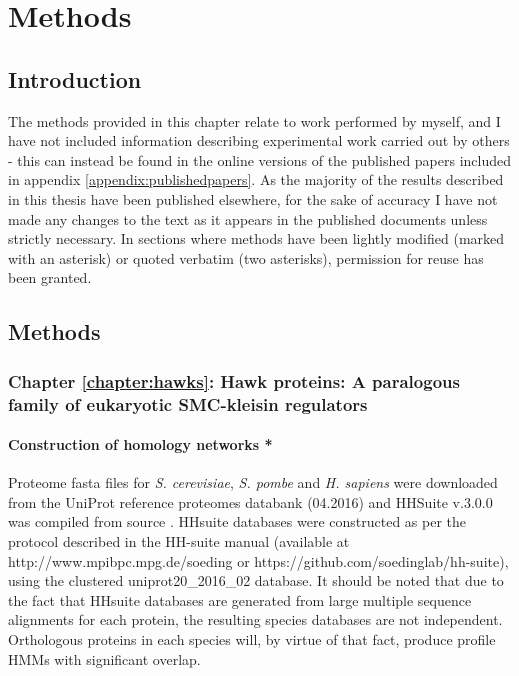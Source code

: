 \documentclass[a4paper,11pt,twoside,openright]{scrbook}
\begin{document}
\chapter{Methods}

\section{Introduction}
The methods provided in this chapter relate to work performed by myself, and I have not included information describing experimental work carried out by others - this can instead be found in the online versions of the published papers included in appendix \ref{appendix:publishedpapers}. As the majority of the results described in this thesis have been published elsewhere, for the sake of accuracy I have not made any changes to the text as it appears in the published documents unless strictly necessary. In sections where methods have been lightly modified (marked with an asterisk) or quoted verbatim (two asterisks), permission for reuse has been granted.

\section{Methods}

\subsection{Chapter \ref*{chapter:hawks}: Hawk proteins: A paralogous family of eukaryotic SMC-kleisin regulators}

\subsubsection{Construction of homology networks *}
Proteome fasta files for \textit{S. cerevisiae}, \textit{S. pombe} and \textit{H. sapiens} were downloaded from the UniProt reference proteomes databank \cite{Consortium2017} (04.2016) and HHSuite v.3.0.0 was compiled from source \cite{Soding2005,Remmert2011}. HHsuite databases were constructed as per the protocol described in the HH-suite manual (available at http://www.mpibpc.mpg.de/soeding or https://github.com/soedinglab/hh-suite), using the clustered uniprot20\_2016\_02 database. It should be noted that due to the fact that HHsuite databases are generated from large multiple sequence alignments for each protein, the resulting species databases are not independent. Orthologous proteins in each species will, by virtue of that fact, produce profile HMMs with significant overlap.
\end{document}
